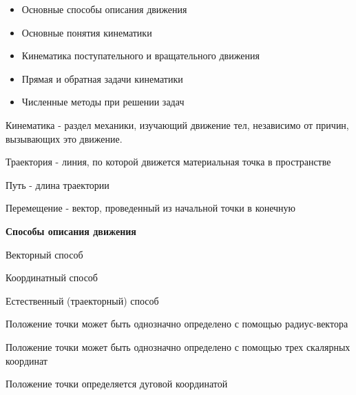 \documentclass[12pt]{article}
\begin{document}
    \begin{tcolorbox}[colframe=blue!25, colback=blue!10, title=\textbf{План лекции}]

        \footnotesize
        \begin{itemize}
            \item Основные способы описания движения

            \item Основные понятия кинематики

            \item Кинематика поступательного и вращательного движения

            \item Прямая и обратная задачи кинематики

            \item Численные методы при решении задач
        \end{itemize}
    \end{tcolorbox}

    \Def Кинематика - раздел механики, изучающий движение тел, независимо от причин, вызывающих это движение.

    \Def Траектория - линия, по которой движется материальная точка в пространстве

    \Def Путь - длина траектории

    \Def Перемещение - вектор, проведенный из начальной точки в конечную

    \smallvspace

    \textbf{Способы описания движения}

    \begin{multicols}{3}

        \begin{tcolorbox}
            Векторный способ
        \end{tcolorbox}

        \begin{tcolorbox}
            Координатный способ
        \end{tcolorbox}

        \begin{tcolorbox}
            Естественный (траекторный) способ
        \end{tcolorbox}

    \end{multicols}

    \begin{multicols}{3}

        Положение точки может быть однозначно определено с помощью радиус-вектора

        \smallvspace

        Положение точки может быть однозначно определено с помощью трех скалярных координат

        Положение точки определяется дуговой координатой

        \phantom{.}

    \end{multicols}
\end{document}
